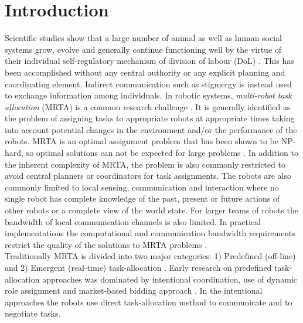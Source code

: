 \documentclass{llncs}
\begin{document}
\section{Introduction}
\label{sec:intro}
Scientific studies show that a large number of animal as well as human social systems grow, evolve and generally continue functioning well by the virtue of their individual self-regulatory mechanism of division of labour (DoL)  \cite{Bonabeau+1999}.
This has been accomplished without any central authority or any explicit planning and coordinating element.
Indirect communication such as stigmergy is instead used to exchange information among individuals. 
In robotic systems, \textit{multi-robot task allocation} (MRTA) is a common research challenge \cite{Gerkey+2004}.
It is generally identified as the problem of assigning tasks to appropriate robots at appropriate times taking into account potential changes in the environment and/or the performance of the robots.
MRTA is an optimal assignment problem that has been shown to be NP-hard, so optimal solutions can not be expected for large problems \cite{Parker2008}.
In addition to the inherent complexity of MRTA, the problem is also commonly restricted to avoid central planners or coordinators for task assignments.
The robots are also commonly limited to local sensing, communication and interaction \cite{Lerman+2006} where no single robot has complete knowledge of the past, present or future actions of other robots or a complete view of the world state.
For larger teams of robots the bandwidth of local communication channels is also limited.
In practical implementations the computational and communication bandwidth requirements restrict the quality of the solutions to MRTA problems \cite{Gerkey+2004,Lerman+2006}.\\
Traditionally MRTA is divided into two major categories: 1) Predefined (off-line) and 2) Emergent (real-time) task-allocation \cite{Shen+2001}.
Early research on predefined task-allocation approaches was dominated by intentional coordination, use of dynamic role assignment \cite{Parker2008} and market-based bidding approach \cite{Dias+2006}.
In the intentional approaches the robots use direct task-allocation method to communicate and to negotiate tasks.
\end{document}
